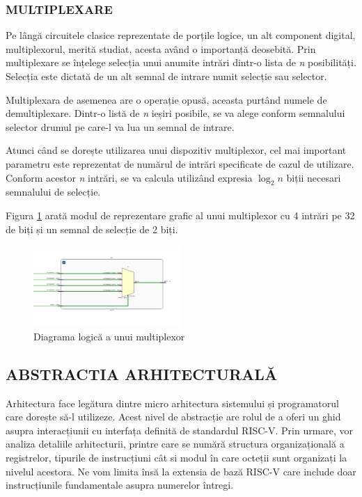\documentclass[12pt]{article}
\begin{document}
\subsubsection{MULTIPLEXARE}
Pe lângă circuitele clasice reprezentate de porțile logice, un alt component digital, multiplexorul, merită studiat, acesta având o importanță deosebită. Prin multiplexare se înțelege selecția unui anumite intrări dintr-o lista de \textit{n} posibilități. Selecția este dictată de un alt semnal de intrare numit selecție sau selector.

Multiplexara de asemenea are o operație opusă, aceasta purtând numele de demultiplexare. Dintr-o listă de \textit{n} ieșiri posibile, se va alege conform semnalului selector drumul pe care-l va lua un semnal de intrare.

Atunci când se dorește utilizarea unui dispozitiv multiplexor, cel mai important parametru este reprezentat de numărul de intrări specificate de cazul de utilizare. Conform acestor \textit{n} intrări, se va calcula utilizând expresia $\log_2{n}$ biții necesari semnalului de selecție.

Figura \ref{Figura:24} arată modul de reprezentare grafic al unui multiplexor cu 4 intrări pe 32 de biți și un semnal de selecție de 2 biți.
 \begin{figure}[h]
 \includegraphics[width=0.5\textwidth]{mux41.png}
 \centering
 \caption{Diagrama logică a unui multiplexor}
 \label{Figura:24}
 \end{figure}
 

\newpage
 \subsection{ABSTRACTIA ARHITECTURALĂ}
Arhitectura face legătura dintre micro arhitectura sistemului și programatorul care dorește să-l utilizeze. Acest nivel de abstracție are rolul de a oferi un ghid asupra interacțiunii cu interfața definită de standardul RISC-V. Prin urmare, vor analiza detaliile arhitecturii, printre care se numără structura organizațională a registrelor, tipurile de instrucțiuni cât si modul în care octeții sunt organizați la nivelul acestora. Ne vom limita însă la extensia de bază RISC-V care include doar instrucțiunile fundamentale asupra numerelor întregi.
\end{document}
